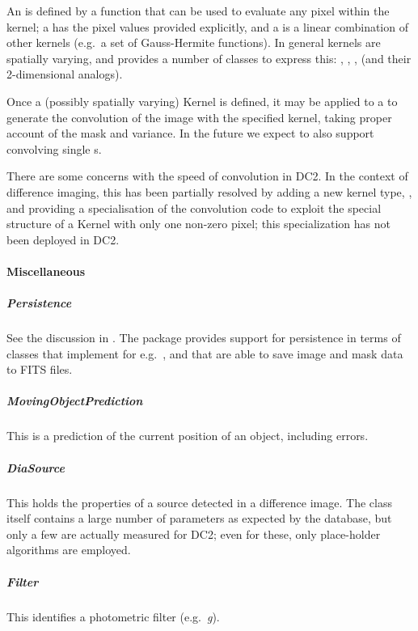 An  is defined by a function that can be used to evaluate
any pixel within the kernel; a  has the pixel values provided
explicitly, and a  is a linear combination of
other kernels (e.g.~a set of Gauss-Hermite functions).  In general kernels
are spatially varying, and  provides a number of classes to express
this: , , ,
 (and their 2-dimensional analogs).

Once a (possibly spatially varying) Kernel is defined, it may be
applied to a  to generate the convolution of the
image with the specified kernel, taking proper account of the mask and
variance.  In the future we expect to also support convolving single
s.

There are some concerns with the speed of convolution in DC2.  In the
context of difference imaging, this has been partially resolved by
adding a new kernel type, , and providing
a specialisation of the convolution code to exploit the special structure
of a Kernel with only one non-zero pixel; this specialization has
not been deployed in DC2.

\paragraph{Miscellaneous}

\subparagraph{Persistence}
See the discussion in .  The  package
provides support for persistence in terms of classes that
implement  for e.g.~,
and that are able to save image and mask data to FITS files.

\subparagraph{MovingObjectPrediction}
This is a prediction of the current position of an object, including
errors.

\subparagraph{DiaSource}
This holds the properties of a source detected in a difference image.  The
class itself contains a large number of parameters as
expected by the database, but only a few are actually measured
for DC2;  even for these, only place-holder algorithms are
employed.

\subparagraph{Filter}
This identifies a photometric filter (e.g.~\textit{g}).



